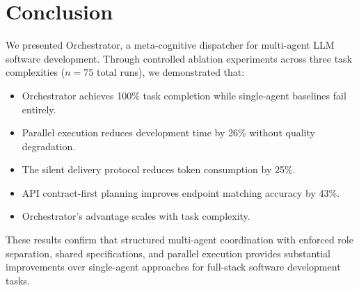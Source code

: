\documentclass[12pt]{article}
\begin{document}
\section{Conclusion}

We presented Orchestrator, a meta-cognitive dispatcher for multi-agent LLM software development. Through controlled ablation experiments across three task complexities ($n=75$ total runs), we demonstrated that:

\begin{itemize}
  \item Orchestrator achieves 100\% task completion while single-agent baselines fail entirely.
  \item Parallel execution reduces development time by 26\% without quality degradation.
  \item The silent delivery protocol reduces token consumption by 25\%.
  \item API contract-first planning improves endpoint matching accuracy by 43\%.
  \item Orchestrator's advantage scales with task complexity.
\end{itemize}

These results confirm that structured multi-agent coordination with enforced role separation, shared specifications, and parallel execution provides substantial improvements over single-agent approaches for full-stack software development tasks.
\end{document}
